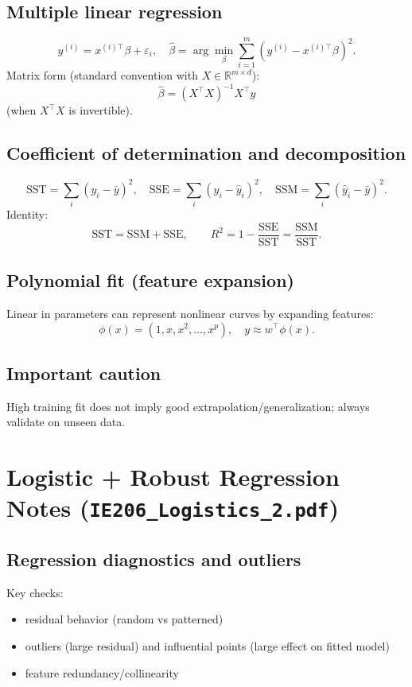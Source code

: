 \documentclass[11pt]{article}
\newcommand{\R}{\mathbb{R}}
\newcommand{\1}{\mathbf{1}}
\begin{document}
\subsection*{Multiple linear regression}
\[
y^{(i)}=x^{(i)\top}\beta+\varepsilon_i,
\quad
\hat\beta=\arg\min_\beta\sum_{i=1}^m(y^{(i)}-x^{(i)\top}\beta)^2.
\]
Matrix form (standard convention with $X\in\R^{m\times d}$):
\[
\hat\beta=(X^\top X)^{-1}X^\top y
\]
(when $X^\top X$ is invertible).

\subsection*{Coefficient of determination and decomposition}
\[
\text{SST}=\sum_i(y_i-\bar y)^2,
\quad
\text{SSE}=\sum_i(y_i-\hat y_i)^2,
\quad
\text{SSM}=\sum_i(\hat y_i-\bar y)^2.
\]
Identity:
\[
\text{SST}=\text{SSM}+\text{SSE},
\qquad
R^2=1-\frac{\text{SSE}}{\text{SST}}=\frac{\text{SSM}}{\text{SST}}.
\]

\subsection*{Polynomial fit (feature expansion)}
Linear in parameters can represent nonlinear curves by expanding features:
\[
\phi(x)=(1,x,x^2,\dots,x^p),
\quad y\approx w^\top\phi(x).
\]

\subsection*{Important caution}
High training fit does not imply good extrapolation/generalization; always validate on unseen data.

\section{Logistic + Robust Regression Notes (\texttt{IE206\_Logistics\_2.pdf})}
\subsection*{Regression diagnostics and outliers}
Key checks:
\begin{itemize}
\item residual behavior (random vs patterned)
\item outliers (large residual) and influential points (large effect on fitted model)
\item feature redundancy/collinearity
\end{itemize}
\end{document}
